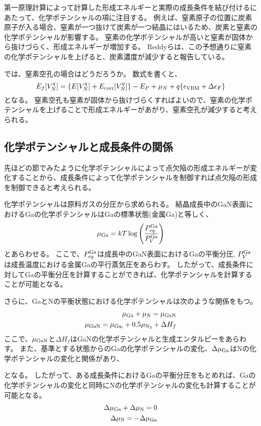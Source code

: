 第一原理計算によって計算した形成エネルギーと実際の成長条件を結び付けるにあたって、化学ポテンシャルの項に注目する。
例えば、窒素原子の位置に炭素原子が入る場合、窒素が一つ抜けて炭素が一つ結晶にはいるため、炭素と窒素の化学ポテンシャルが影響する。
窒素の化学ポテンシャルが高いと窒素が固体から抜けづらく、形成エネルギーが増加する。
Reddyらは、この予想通りに窒素の化学ポテンシャルを上げると、炭素濃度が減少すると報告している。

では、窒素空孔の場合はどうだろうか。
数式を書くと、
\begin{equation}
  E_{f}[V_{N}^{q}] = \qty{ E[V_{N}^{q}] + E_{\rm{corr}}[V_{N}^{q}]} - E_{P} + \mu _{N} + q\qty{ \epsilon _{\rm{VBM}}+\Delta \epsilon _{F}}
\end{equation}
となる。
窒素空孔も窒素が固体から抜けづらくすればよいので、窒素の化学ポテンシャルを上げることで形成エネルギーがあがり、窒素空孔が減少すると考えられる。

\subsection{化学ポテンシャルと成長条件の関係}
先ほどの節でみたように化学ポテンシャルによって点欠陥の形成エネルギーが変化することから、成長条件によって化学ポテンシャルを制御すれば点欠陥の形成を制御できると考えられる。

化学ポテンシャルは原料ガスの分圧から求められる。
結晶成長中のGaN表面におけるGaの化学ポテンシャルはGaの標準状態(金属Ga)と等しく、
\begin{equation}
  \mu_{\rm{Ga}} = kT \log \qty(\frac{P_{eq}^{\rm{Ga}}}{P_{V}^{\rm{Ga}}})
\end{equation}
とあらわせる。
ここで、$P_{eq}^{\rm{Ga}}$は成長中のGaN表面におけるGaの平衡分圧, $P_{V}^{\rm{Ga}}$は成長温度における金属Gaの平行蒸気圧をあらわす。
したがって、成長条件に対してGaの平衡分圧を計算することができれば、化学ポテンシャルを計算することが可能となる。

さらに、GaとNの平衡状態における化学ポテンシャルは次のような関係をもつ。
\begin{align}
  \mu_{\rm{Ga}} + \mu_{\rm{N}} = \mu_{\rm{GaN}} \\
  \mu_{\rm{GaN}} = \mu_{\rm{Ga}_{l}} + 0.5  \mu_{\rm{N}_{2}} + \Delta H_{f}
\end{align}
ここで、$\mu_{\rm{GaN}}$と$\Delta H_{f}$はGaNの化学ポテンシャルと生成エンタルピーをあらわす。
また、基準とする状態からのGaの化学ポテンシャルの変化、$\Delta \mu_{\rm{Ga}}$はNの化学ポテンシャルの変化と関係があり、

となる。
したがって、ある成長条件におけるGaの平衡分圧をもとめれば、Gaの化学ポテンシャルの変化と同時にNの化学ポテンシャルの変化も計算することが可能となる。
\begin{align}
  \Delta \mu_{\rm{Ga}} + \Delta \mu_{\rm{N}} = 0 \\
  \Delta \mu_{\rm{N}} = - \Delta \mu_{\rm{Ga}}
\end{align}
